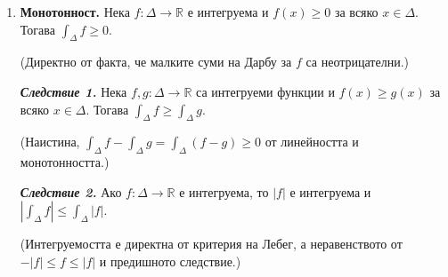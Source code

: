 \documentclass[11pt]{article}
\numberwithin{equation}{section}
\numberwithin{figure}{section}
\numberwithin{table}{section}
\theoremstyle{plain}
\theoremstyle{definition}
\theoremstyle{remark}
\theoremstyle{definition}
\theoremstyle{remark}
\theoremstyle{plain}
\theoremstyle{definition}
\theoremstyle{definition}
\theoremstyle{plain}
\theoremstyle{plain}
\theoremstyle{plain}
\theoremstyle{definition}
\theoremstyle{plain}
\newcommand*{\R}{\mathbb{R}}
\begin{document}
\begin{enumerate}
\item \textbf{Монотонност.} Нека $f:\Delta\longrightarrow\R$ е интегруема и $f(x)\ge 0$ за всяко $x\in \Delta$. Тогава $\int_\Delta f \ge 0$. 

(Директно от факта, че малките суми на Дарбу за $f$ са неотрицателни.)

\textbf{\textit{Следствие 1.}} Нека $f, g: \Delta \longrightarrow\R$ са интегруеми функции и $f(x)\ge g(x)$ за всяко $x\in \Delta$. Тогава $\int_\Delta f \ge \int_\Delta g$.

(Наистина, $\int_\Delta f - \int_\Delta g=\int_\Delta (f -g) \ge 0$ от линейността и монотонността.)

\textbf{\textit{Следствие 2.}} Ако $f:\Delta\longrightarrow\R$ е интегруема, то $|f|$ е интегруема и $|\int_\Delta f|\le \int_\Delta |f|$.

(Интегруемостта е директна от критерия на Лебег, а неравенството от $-|f|\le f\le |f|$ и предишното следствие.)
\end{enumerate}
\end{document}
